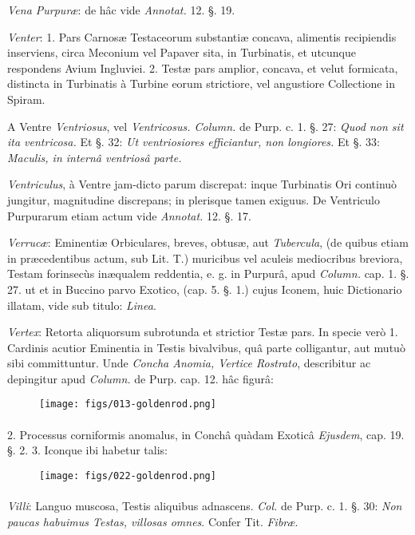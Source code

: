 \documentclass[a4paper, 11pt, oneside, polutonikogreek, german]{article}
\begin{document}
\emph{Vena Purpuræ}: de hâc vide \emph{Annotat.} 12. §. 19.

\emph{Venter}: 1. Pars Carnosæ Testaceorum substantiæ concava, alimentis recipiendis inserviens, circa Meconium vel Papaver sita, in Turbinatis, et utcunque respondens Avium Ingluviei. 2. Testæ pars amplior, concava, et velut formicata, distincta in Turbinatis à Turbine eorum strictiore, vel angustiore Collectione in Spiram.

A Ventre \emph{Ventriosus}, vel \emph{Ventricosus. Column.} de Purp. c. 1. §. 27: \emph{Quod non sit ita ventricosa.} Et §. 32: \emph{Ut ventriosiores efficiantur, non longiores.} Et §. 33: \emph{Maculis, in internâ ventriosâ parte.}

\emph{Ventriculus}, à Ventre jam-dicto parum discrepat: inque Turbinatis Ori continuò jungitur, magnitudine discrepans; in plerisque tamen exiguus. De Ventriculo Purpurarum etiam actum vide \emph{Annotat.} 12. §. 17.

\emph{Verrucæ}: Eminentiæ Orbiculares, breves, obtusæ, aut \emph{Tubercula}, (de quibus etiam in præcedentibus actum, sub Lit. T.) muricibus vel aculeis mediocribus breviora, Testam forinsecùs inæqualem reddentia, e. g. in Purpurâ, apud \emph{Column.} cap. 1. §. 27. ut et in Buccino parvo Exotico, (cap. 5. §. 1.) cujus Iconem, huic Dictionario illatam, vide sub titulo: \emph{Linea}.

\emph{Vertex}: Retorta aliquorsum subrotunda et strictior Testæ pars. In specie verò 1. Cardinis acutior Eminentia in Testis bivalvibus, quâ parte colligantur, aut mutuò sibi committuntur. Unde \emph{Concha Anomia, Vertice Rostrato}, describitur ac depingitur apud \emph{Column.} de Purp. cap. 12. hâc figurâ:

\begin{figure}[H]
\centering
\texttt{[image: figs/013-goldenrod.png]}
\end{figure}
\paragraph{}
2. Processus corniformis anomalus, in Conchâ quàdam Exoticâ \emph{Ejusdem}, cap. 19. §. 2. 3. Iconque ibi habetur talis:

\begin{figure}[H]
\centering
\texttt{[image: figs/022-goldenrod.png]}
\end{figure}
\paragraph{}
\emph{Villi}: Languo muscosa, Testis aliquibus adnascens. \emph{Col.} de Purp. c. 1. §. 30: \emph{Non paucas habuimus Testas, villosas omnes}. Confer Tit. \emph{Fibræ}.
\end{document}

